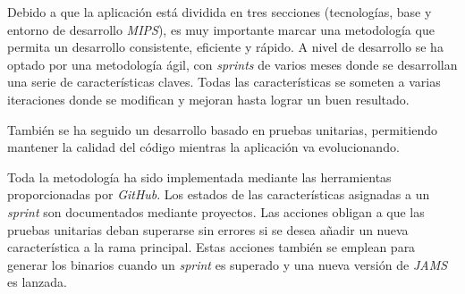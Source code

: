 Debido a que la aplicación está dividida en tres secciones (tecnologías, base y entorno de desarrollo \textit{MIPS}),
es muy importante marcar una metodología que permita un desarrollo consistente, eficiente y rápido.
A nivel de desarrollo se ha optado por una metodología ágil, con \textit{sprints} de varios meses
donde se desarrollan una serie de características claves.
Todas las características se someten a varias iteraciones donde se modifican y mejoran hasta lograr un
buen resultado.

\noindent También se ha seguido un desarrollo basado en pruebas unitarias,
permitiendo mantener la calidad del código mientras la aplicación va evolucionando.

\noindent Toda la metodología ha sido implementada mediante las herramientas proporcionadas por \textit{GitHub}.
Los estados de las características asignadas a un \textit{sprint} son documentados mediante proyectos.
Las acciones obligan a que las pruebas unitarias deban superarse sin errores si se desea añadir un nueva
característica a la rama principal.
Estas acciones también se emplean para generar los binarios cuando un \textit{sprint} es superado y una
nueva versión de \textit{JAMS} es lanzada.

